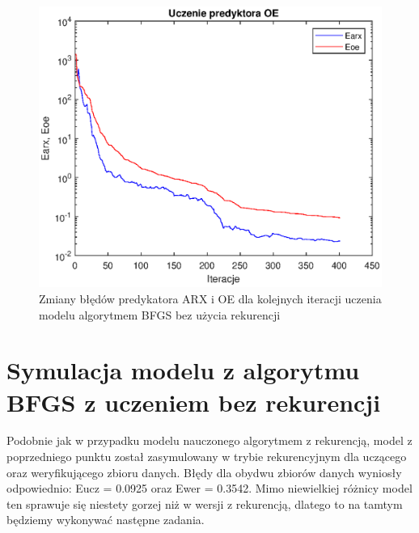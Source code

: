 		\begin{figure}[h!]
			\centering
			\includegraphics[width=\linewidth]{img/BFGS_ARX_p.eps}
			\caption{Zmiany błędów predykatora ARX i OE dla kolejnych iteracji uczenia modelu algorytmem BFGS bez użycia rekurencji}
			\label{fig:bfgs_arx_p}
		\end{figure}
		
		\newpage
	\section{Symulacja modelu z algorytmu BFGS z uczeniem bez rekurencji}
		\label{sec:bfgs_arx_sym}
		Podobnie jak w przypadku modelu nauczonego algorytmem z rekurencją, model z poprzedniego punktu został zasymulowany w trybie rekurencyjnym dla uczącego oraz weryfikującego zbioru danych. Błędy dla obydwu zbiorów danych wyniosły odpowiednio: Eucz = 0.0925 oraz Ewer = 0.3542. Mimo niewielkiej różnicy model ten sprawuje się niestety gorzej niż w wersji z rekurencją, dlatego to na tamtym będziemy wykonywać następne zadania.
		
